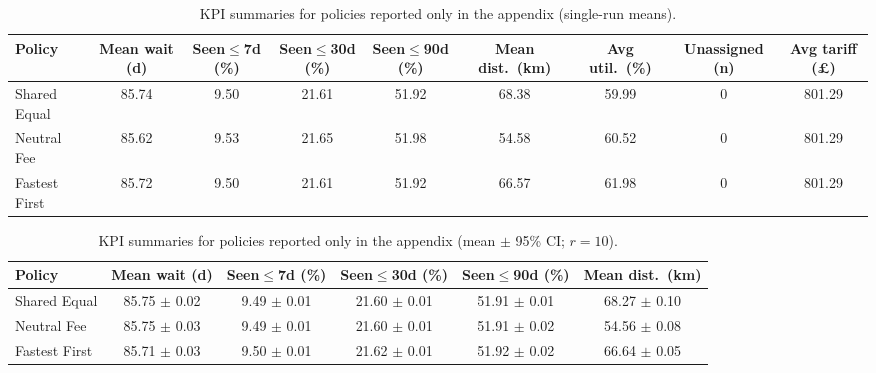 \documentclass[ %
                    author={Nattanan Nawakitbamrung},
                supervisor={Dr. Sébastien Rochat},
                    degree={MSc},
                     title={Developing and Evaluating the Impact of a Single Patient Treatment List (PTL) for an NHS Integrated Care System},
                  subtitle={},
                      type={},
                      year={2025}]{dissertation}
\begin{document}
\FloatBarrier

\begin{table}[htbp]
\centering
\small
\setlength{\tabcolsep}{4pt}
\begin{adjustbox}{width=\linewidth}
\begin{tabular}{lcccccccc}
\toprule
\textbf{Policy} &
\textbf{Mean wait (d)} &
\textbf{Seen$\le$7d (\%)} &
\textbf{Seen$\le$30d (\%)} &
\textbf{Seen$\le$90d (\%)} &
\textbf{Mean dist.\ (km)} &
\textbf{Avg util.\ (\%)} &
\textbf{Unassigned (n)} &
\textbf{Avg tariff (\pounds)} \\
\midrule
Shared Equal   & 85.74 & 9.50 & 21.61 & 51.92 & 68.38 & 59.99 & 0 & 801.29 \\
Neutral Fee    & 85.62 & 9.53 & 21.65 & 51.98 & 54.58 & 60.52 & 0 & 801.29 \\
Fastest First  & 85.72 & 9.50 & 21.61 & 51.92 & 66.57 & 61.98 & 0 & 801.29 \\
\bottomrule
\end{tabular}
\end{adjustbox}
\caption{KPI summaries for policies reported only in the appendix (single-run means).}
\label{tab:app-kpi-single}
\end{table}

\begin{table}[้้h!]
\centering
\small
\setlength{\tabcolsep}{4pt}
\begin{adjustbox}{width=\linewidth}
\begin{tabular}{lccccc}
\toprule
\textbf{Policy} & \textbf{Mean wait (d)} & \textbf{Seen$\le$7d (\%)} &
\textbf{Seen$\le$30d (\%)} & \textbf{Seen$\le$90d (\%)} & \textbf{Mean dist.\ (km)} \\
\midrule
Shared Equal  & 85.75 $\pm$ 0.02 & 9.49 $\pm$ 0.01 & 21.60 $\pm$ 0.01 & 51.91 $\pm$ 0.01 & 68.27 $\pm$ 0.10 \\
Neutral Fee   & 85.75 $\pm$ 0.03 & 9.49 $\pm$ 0.01 & 21.60 $\pm$ 0.01 & 51.91 $\pm$ 0.02 & 54.56 $\pm$ 0.08 \\
Fastest First & 85.71 $\pm$ 0.03 & 9.50 $\pm$ 0.01 & 21.62 $\pm$ 0.01 & 51.92 $\pm$ 0.02 & 66.64 $\pm$ 0.05 \\
\bottomrule
\end{tabular}
\end{adjustbox}
\caption{KPI summaries for policies reported only in the appendix (mean $\pm$ 95\% CI; $r=10$).}
\label{tab:app-kpi-ci}
\end{table}
\end{document}
